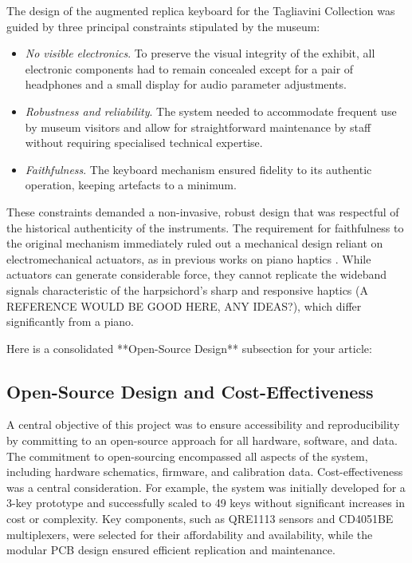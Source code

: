 The design of the augmented replica keyboard for the Tagliavini Collection was guided by three principal constraints stipulated by the museum:
\begin{itemize}
\item \emph{No visible electronics}. To preserve the visual integrity of the exhibit, all electronic components had to remain concealed except for a pair of headphones and a small display for audio parameter adjustments.
\item \emph{Robustness and reliability}. The system needed to accommodate frequent use by museum visitors and allow for straightforward maintenance by staff without requiring specialised technical expertise.
\item \emph{Faithfulness}. The keyboard mechanism ensured fidelity to its authentic operation, keeping artefacts to a minimum. 
\end{itemize}
These constraints demanded a non-invasive, robust design that was respectful of the historical authenticity of the instruments. The requirement for faithfulness to the original mechanism immediately ruled out a mechanical design reliant on electromechanical actuators, as in previous works on piano haptics \cite{Timmermans2020,Gillespie1996}. While actuators can generate considerable force, they cannot replicate the wideband signals characteristic of the harpsichord's sharp and responsive haptics (A REFERENCE WOULD BE GOOD HERE, ANY IDEAS?), which differ significantly from a piano.

Here is a consolidated **Open-Source Design** subsection for your article:


\subsection{Open-Source Design and Cost-Effectiveness}\label{susec:open-source}

A central objective of this project was to ensure accessibility and reproducibility by committing to an open-source approach for all hardware, software, and data. The commitment to open-sourcing encompassed all aspects of the system, including hardware schematics, firmware, and calibration data. Cost-effectiveness was a central consideration. For example, the system was initially developed for a 3-key prototype and successfully scaled to 49 keys without significant increases in cost or complexity. Key components, such as QRE1113 sensors and CD4051BE multiplexers, were selected for their affordability and availability, while the modular PCB design ensured efficient replication and maintenance.

